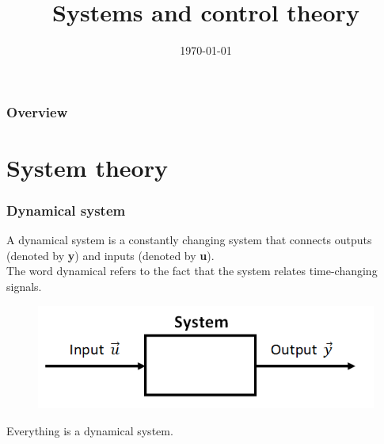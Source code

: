 \documentclass{beamer}
\title[Systems and control theory]{Systems and control theory} %
\author{} %
\institute[KU Leuven] %
{
Katholieke Universiteit Leuven \\ %
\medskip
\textit{} %
}
\date{\today} %
\begin{document}
\begin{frame}
\titlepage %
\end{frame}

\begin{frame}
\frametitle{Overview} %
\tableofcontents %
\end{frame}


\section{System theory} 

\begin{frame}
\frametitle{Dynamical system}
A dynamical system is a constantly changing system that connects outputs (denoted by \textbf y) and inputs (denoted by \textbf u).\\The word dynamical refers to the fact that the system relates time-changing signals.
\begin{figure}
\includegraphics[width=0.8\linewidth]{Dynamical_system}
\end{figure}
\medskip
Everything is a dynamical system.
\end{frame}

\end{document}

